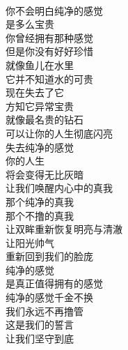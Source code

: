 \begin{poem}[千金不换]
    \begin{multicols}{2}
        \begin{center}~\\
            你不会明白纯净的感觉 \\ 是多么宝贵 \\ 你曾经拥有那种感觉 \\ 但是你没有好好珍惜 \\ 就像鱼儿在水里 \\ 它并不知道水的可贵 \\ 现在失去了它 \\ 方知它异常宝贵 \\ 就像最名贵的钻石 \\ 可以让你的人生彻底闪亮 \\ 失去纯净的感觉 \\ 你的人生 \\ 将会变得无比灰暗 \\ 让我们唤醒内心中的真我 \\ 那个纯净的真我 \\ 那个不撸的真我 \\ 让双眸重新恢复明亮与清澈 \\ 让阳光帅气 \\ 重新回到我们的脸庞 \\ 纯净的感觉 \\ 是真正值得拥有的感觉 \\ 纯净的感觉千金不换 \\ 我们永远不再撸管 \\ 这是我们的誓言 \\ 让我们坚守到底
        \end{center}
    \end{multicols}
\end{poem}
